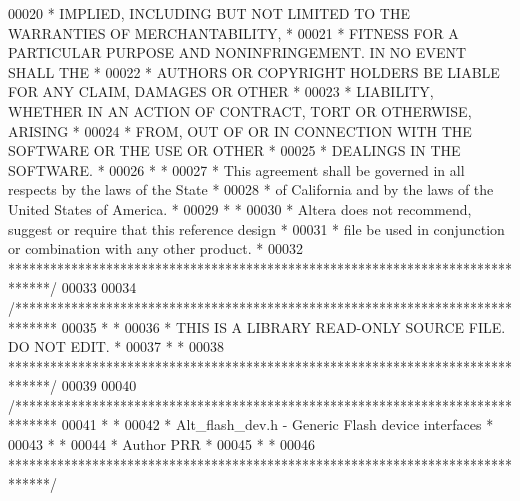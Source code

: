 \begin{DoxyCode}
00020 \textcolor{comment}{* IMPLIED, INCLUDING BUT NOT LIMITED TO THE WARRANTIES OF MERCHANTABILITY,    *}
00021 \textcolor{comment}{* FITNESS FOR A PARTICULAR PURPOSE AND NONINFRINGEMENT. IN NO EVENT SHALL THE *}
00022 \textcolor{comment}{* AUTHORS OR COPYRIGHT HOLDERS BE LIABLE FOR ANY CLAIM, DAMAGES OR OTHER      *}
00023 \textcolor{comment}{* LIABILITY, WHETHER IN AN ACTION OF CONTRACT, TORT OR OTHERWISE, ARISING     *}
00024 \textcolor{comment}{* FROM, OUT OF OR IN CONNECTION WITH THE SOFTWARE OR THE USE OR OTHER         *}
00025 \textcolor{comment}{* DEALINGS IN THE SOFTWARE.                                                   *}
00026 \textcolor{comment}{*                                                                             *}
00027 \textcolor{comment}{* This agreement shall be governed in all respects by the laws of the State   *}
00028 \textcolor{comment}{* of California and by the laws of the United States of America.              *}
00029 \textcolor{comment}{*                                                                             *}
00030 \textcolor{comment}{* Altera does not recommend, suggest or require that this reference design    *}
00031 \textcolor{comment}{* file be used in conjunction or combination with any other product.          *}
00032 \textcolor{comment}{******************************************************************************/}
00033 
00034 \textcolor{comment}{/******************************************************************************}
00035 \textcolor{comment}{*                                                                             *}
00036 \textcolor{comment}{* THIS IS A LIBRARY READ-ONLY SOURCE FILE. DO NOT EDIT.                       *}
00037 \textcolor{comment}{*                                                                             *}
00038 \textcolor{comment}{******************************************************************************/}
00039 
00040 \textcolor{comment}{/******************************************************************************}
00041 \textcolor{comment}{*                                                                             *}
00042 \textcolor{comment}{* Alt\_flash\_dev.h - Generic Flash device interfaces                           *}
00043 \textcolor{comment}{*                                                                             *}
00044 \textcolor{comment}{* Author PRR                                                                  *}
00045 \textcolor{comment}{*                                                                             *}
00046 \textcolor{comment}{******************************************************************************/}

\end{DoxyCode}
